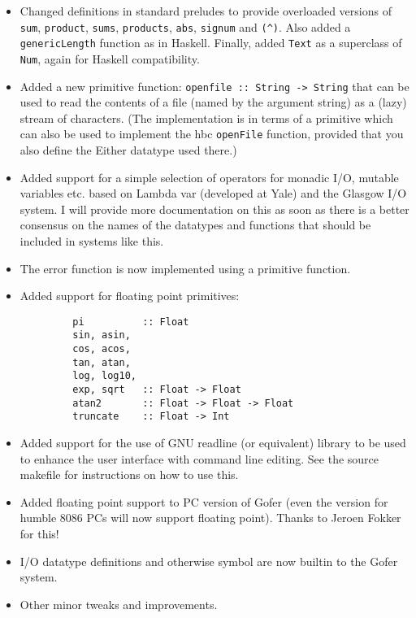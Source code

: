 \begin{itemize}
\item  Changed definitions in standard preludes to provide overloaded
     versions of \verb"sum", \verb"product", \verb"sums", \verb"products", \verb"abs", \verb"signum" and \verb"(^)".
     Also added a \verb"genericLength" function as in Haskell.  Finally,
     added \verb"Text" as a superclass of \verb"Num", again for Haskell compatibility.

\item  Added a new primitive function: \verb"openfile :: String -> String" that
     can be used to read the contents of a file (named by the argument
     string) as a (lazy) stream of characters.  (The implementation is
     in terms of a primitive which can also be used to implement the
     hbc \verb"openFile" function, provided that you also define the Either
     datatype used there.)

\item  Added support for a simple selection of operators for monadic I/O,
     mutable variables etc. based on Lambda var (developed at Yale) and
     the Glasgow I/O system.  I will provide more documentation on this
     as soon as there is a better consensus on the names of the
     datatypes and functions that should be included in systems like
     this.
 
\item  The error function is now implemented using a primitive function.

\item  Added support for floating point primitives:
\begin{verbatim}
         pi          :: Float
         sin, asin,
         cos, acos,
         tan, atan,
         log, log10,
         exp, sqrt   :: Float -> Float
         atan2       :: Float -> Float -> Float
         truncate    :: Float -> Int
\end{verbatim}
\item  Added support for the use of GNU readline (or equivalent) library
     to be used to enhance the user interface with command line
     editing.  See the source makefile for instructions on how to use
     this.

\item  Added floating point support to PC version of Gofer (even the
     version for humble 8086 PCs will now support floating point).
     Thanks to Jeroen Fokker for this!

\item  I/O datatype definitions and otherwise symbol are now builtin to
     the Gofer system.

\item  Other minor tweaks and improvements.
\end{itemize}


